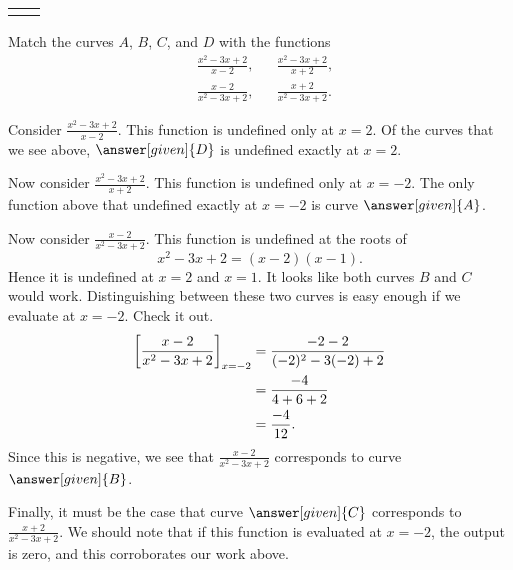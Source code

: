 \documentclass{ximera}
\begin{document}
\begin{example}
\begin{image}
\begin{tabular}{cc}
\begin{tikzpicture}
\begin{axis}
      \end{axis}
    \end{tikzpicture}
  \end{tabular}
\end{image}
Match the curves $A$, $B$, $C$, and $D$ with the functions
  \begin{align*}
    &\frac{x^2-3x+2}{x-2}, &&\frac{x^2-3x+2}{x+2}, \\
    &\frac{x-2}{x^2-3x+2}, &&\frac{x+2}{x^2-3x+2}.
  \end{align*}
\begin{explanation}
  Consider $\frac{x^2-3x+2}{x-2}$. This function is undefined only at
  $x=2$. Of the curves that we see above, $\answer[given]{D}$ is
  undefined exactly at $x=2$.

  Now consider $\frac{x^2-3x+2}{x+2}$. This function is undefined only
  at $x=-2$. The only function above that undefined exactly at $x=-2$
  is curve $\answer[given]{A}$.

  Now consider $\frac{x-2}{x^2-3x+2}$. This function is undefined at
  the roots of
  \[
  x^2-3x+2 = (x-2)(x-1).
  \]
  Hence it is undefined at $x=2$ and $x=1$. It looks like both curves
  $B$ and $C$ would work. Distinguishing between these two curves is
  easy enough if we evaluate at $x=-2$. Check it out.
  \begin{align*}
    \bigg[ \frac{x-2}{x^2-3x+2} \bigg]_{x=-2} &= \frac{-2-2}{(-2)^2-3(-2)+2}\\
    &= \frac{-4}{4+6+2}\\
    &=\frac{-4}{12}.
  \end{align*}
  Since this is negative, we see that $\frac{x-2}{x^2-3x+2}$
  corresponds to curve $\answer[given]{B}$.

  Finally, it must be the case that curve $\answer[given]{C}$
  corresponds to $\frac{x+2}{x^2-3x+2}$. We should note that if this
  function is evaluated at $x=-2$, the output is zero, and this
  corroborates our work above.
\end{explanation}
\end{example}


\end{document}
